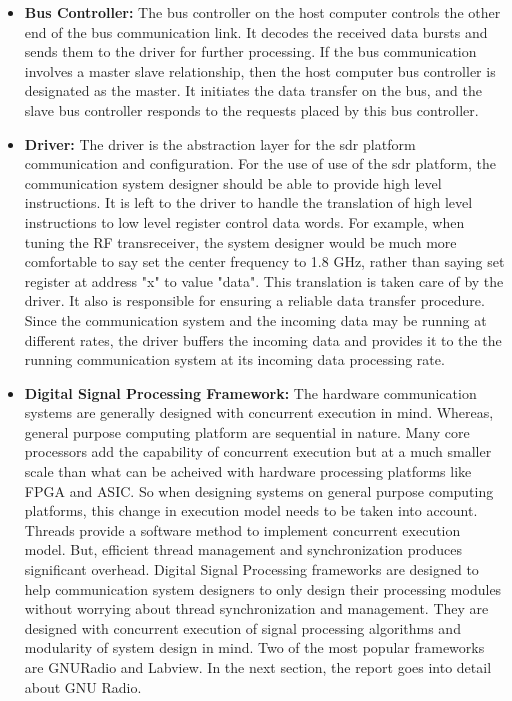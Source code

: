 \begin{itemize}
\item{\textbf{Bus Controller:} The bus controller on the host computer controls the other end of the bus communication link.
It decodes the received data bursts and sends them to the driver for further processing.
If the bus communication involves a master slave relationship, then the host computer bus controller is designated as the master.
It initiates the data transfer on the bus, and the slave bus controller  responds to the requests placed by this bus controller.
}
\item{\textbf{Driver:} The driver is the abstraction layer for the \ac{sdr} platform communication and configuration.
For the use of use of the \ac{sdr} platform, the communication system designer should be able to provide high level instructions.
It is left to the driver to handle the translation of high level instructions to low level register control data words.
For example, when tuning the RF transreceiver, the system designer would be much more comfortable to say set the center frequency to 1.8 GHz, rather than saying set register at address "x" to value "data".
This translation is taken care of by the driver.
It also is responsible for ensuring a reliable data transfer procedure.
Since the communication system and the incoming data may be running at different rates, the driver buffers the incoming data and provides it to the the running communication system at its incoming data processing rate.}
\item{\textbf{Digital Signal Processing Framework:} The hardware communication systems are generally designed with concurrent execution in mind.
Whereas, general purpose computing platform are sequential in nature. Many core processors add the capability of concurrent execution but at a much smaller scale than what can be acheived with hardware processing platforms like \ac{FPGA} and \ac{ASIC}.
So when designing systems on general purpose computing platforms, this change in execution model needs to be taken into account.\\

Threads provide a software method to implement concurrent execution model. 
But, efficient thread management and synchronization produces significant overhead.
Digital Signal Processing frameworks are designed to help communication system designers to only design their processing modules without worrying about thread synchronization and management.
They are designed with concurrent execution of signal processing algorithms and modularity of system design in mind.
Two of the most popular frameworks are GNURadio and Labview.
In the next section, the report goes into detail about GNU Radio. 
}
\end{itemize}
